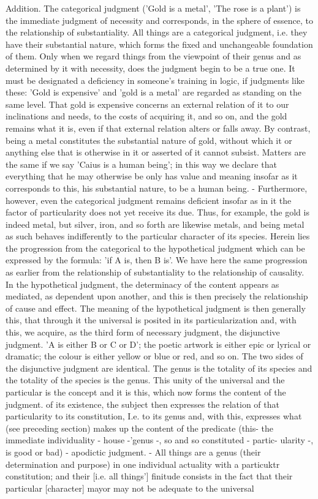 Addition. The categorical judgment ('Gold is a metal', 'The rose is a plant') is
the immediate judgment of necessity and corresponds, in the sphere of essence, to
the relationship of substantiality. All things are a categorical judgment, i.e. they
have their substantial nature, which forms the fixed and unchangeable foundation
of them. Only when we regard things from the viewpoint of their genus and as
determined by it with necessity, does the judgment begin to be a true one. It must
be designated a deficiency in someone's training in logic, if judgments like these:
'Gold is expensive' and 'gold is a metal' are regarded as standing on the same level.
That gold is expensive concerns an external relation of it to our inclinations and
needs, to the costs of acquiring it, and so on, and the gold remains what it is, even
if that external relation alters or falls away. By contrast, being a metal constitutes
the substantial nature of gold, without which it or anything else that is otherwise
in it or asserted of it cannot subsist. Matters are the same if we say 'Caius is a
human being'; in this way we declare that everything that he may otherwise be
only has value and meaning insofar as it corresponds to this, his substantial nature,
to be a human being. - Furthermore, however, even the categorical judgment
remains deficient insofar as in it the factor of particularity does not yet receive
its due. Thus, for example, the gold is indeed metal, but silver, iron, and
so forth are likewise metals, and being metal as such behaves indifferently to the
particular character of its species. Herein lies the progression from the categorical
to the hypothetical judgment which can be expressed by the formula: 'if A is,
then B is'. We have here the same progression as earlier from the relationship
of substantiality to the relationship of causality. In the hypothetical judgment,
the determinacy of the content appears as mediated, as dependent upon another,
and this is then precisely the relationship of cause and effect. The meaning of
the hypothetical judgment is then generally this, that through it the universal is
posited in its particularization and, with this, we acquire, as the third form of
necessary judgment, the disjunctive judgment. 'A is either B or C or D'; the poetic
artwork is either epic or lyrical or dramatic; the colour is either yellow or blue or
red, and so on. The two sides of the disjunctive judgment are identical. The genus
is the totality of its species and the totality of the species is the genus. This unity
of the universal and the particular is the concept and it is this, which now forms
the content of the judgment. of its existence, the subject then expresses the relation of
that particularity to its constitution, I.e. to its genus and, with this, expresses
what (see preceding section) makes up the content of the predicate (this-
the immediate individuality - house -'genus -, so and so constituted - partic-
ularity -, is good or bad) - apodictic judgment. - All things are a genus (their
determination and purpose) in one individual actuality with a particuktr
constitution; and their [i.e. all things'] finitude consists in the fact that
their particular [character] mayor may not be adequate to the universal

